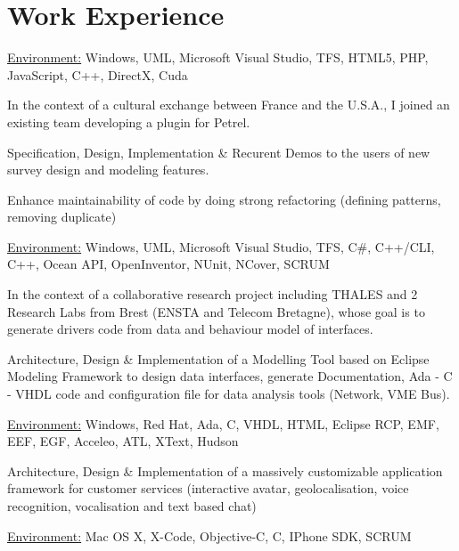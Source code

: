 \documentclass[10pt,letterpaper]{resume/resume}
\begin{document}
  \begin{minipage}[t]{\linewidth}
    \section{Work Experience}

\par 
\par\underline{Environment:} Windows, UML, Microsoft Visual Studio, TFS, HTML5, PHP, JavaScript, C++, DirectX, Cuda

\par In the context of a cultural exchange between France and the U.S.A., I joined an existing team developing a plugin for Petrel.
\par Specification, Design, Implementation \& Recurent Demos to the users of new survey design and modeling features.
\par Enhance maintainability of code by doing strong refactoring (defining patterns, removing duplicate)
\par\underline{Environment:} Windows, UML, Microsoft Visual Studio, TFS, C\#, C++/CLI, C++, Ocean API, OpenInventor, NUnit, NCover, SCRUM


\par In the context of a collaborative research project including THALES and 2 Research Labs from Brest (ENSTA and Telecom Bretagne), whose goal is to generate drivers code from data and behaviour model of interfaces.
\par Architecture, Design \& Implementation of a Modelling Tool based on Eclipse Modeling Framework to design data interfaces, generate Documentation, Ada - C - VHDL code and configuration file for data analysis tools (Network, VME Bus).
\par\underline{Environment:} Windows, Red Hat, Ada, C, VHDL, HTML, Eclipse RCP, EMF, EEF, EGF, Acceleo, ATL, XText, Hudson

\par Architecture, Design \& Implementation of a massively customizable application framework for customer services (interactive avatar, geolocalisation, voice recognition, vocalisation and text based chat) 
\par\underline{Environment:} Mac OS X, X-Code, Objective-C, C, IPhone SDK, SCRUM


\end{minipage}
\end{document}
